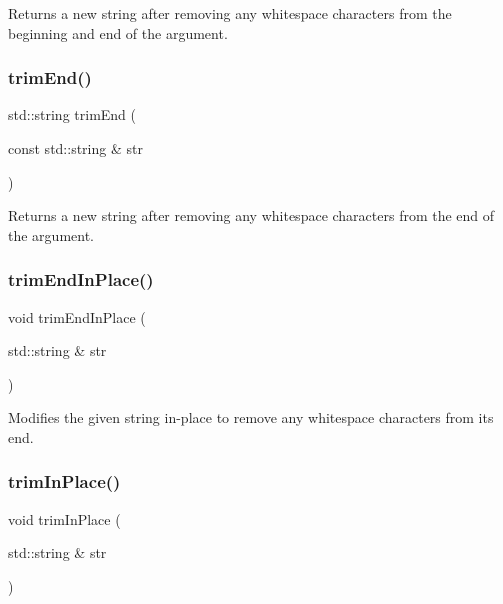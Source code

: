 Returns a new string after removing any whitespace characters from the beginning and end of the argument. 

\mbox{\label{namespacesgl_1_1priv_1_1strlib_a369c1375de145427183c1b3e3e8b5fde}} 
\subsubsection{\texorpdfstring{trim\+End()}{trimEnd()}}
{\footnotesize\ttfamily std\+::string trim\+End (\begin{DoxyParamCaption}\item[{const std\+::string \&}]{str }\end{DoxyParamCaption})}



Returns a new string after removing any whitespace characters from the end of the argument. 

\mbox{\label{namespacesgl_1_1priv_1_1strlib_ac50a0b8051eb7e5400cd949e962dbc1a}} 
\subsubsection{\texorpdfstring{trim\+End\+In\+Place()}{trimEndInPlace()}}
{\footnotesize\ttfamily void trim\+End\+In\+Place (\begin{DoxyParamCaption}\item[{std\+::string \&}]{str }\end{DoxyParamCaption})}



Modifies the given string in-\/place to remove any whitespace characters from its end. 

\mbox{\label{namespacesgl_1_1priv_1_1strlib_a41b53191870377c67ad37dd21404df8d}} 
\subsubsection{\texorpdfstring{trim\+In\+Place()}{trimInPlace()}}
{\footnotesize\ttfamily void trim\+In\+Place (\begin{DoxyParamCaption}\item[{std\+::string \&}]{str }\end{DoxyParamCaption})}



